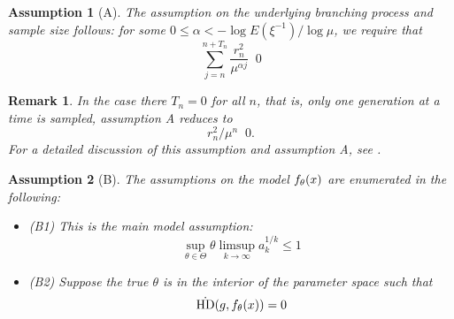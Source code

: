 \documentclass[11 pt]{article}
\newtheorem*{ass*}{Assumption}
\newtheorem{rem}{Remark}
\renewcommand{\th}{\theta}
\newcommand{\xra}[1]{\mathop{ \xrightarrow{#1} }}
\newcommand{\hell}{\text{HD}}
\newcommand{\dhell}{\dot{\hell}}
\begin{document}
\begin{ass*}[A] The assumption on the underlying branching process and sample size follows: for some $0 \leq \alpha < -\log E(\xi^{-1}) / \log \mu$, we require that
\[
\sum_{j = n}^{n + T_n} \frac{r_n^2}{\mu^{\alpha j}} \xra{n \rightarrow \infty} 0
\]
\end{ass*}

\begin{rem}
In the case there $T_n = 0$ for all $n$, that is, only one generation at a time is sampled, assumption A reduces to
\[
r_n^2 / \mu^n \xra{n \rightarrow \infty} 0.
\]
For a detailed discussion of this assumption and assumption A, see \cite{mm}.
\end{rem}

\begin{ass*}[B] The assumptions on the model $\fth$ are enumerated in the following:
\begin{itemize}
  \item{(B1)} This is the main model assumption: 
\[
\sup_{\th \in \Theta} \th \limsup_{k \rightarrow \infty} a_k^{1/k} \leq 1
\]
  \item{(B2)} Suppose the true $\th$ is in the interior of the parameter space such that
\[
\dhell (g,\fth) = 0
\]


\end{itemize}
\end{ass*}
\end{document}
